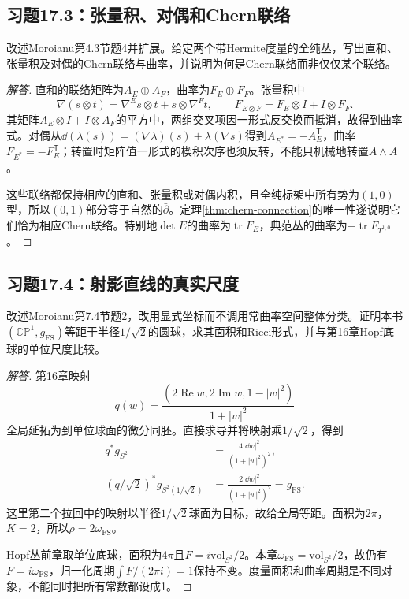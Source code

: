 \subsection*{习题17.3：张量积、对偶和Chern联络}
改述Moroianu第4.3节题4并扩展。给定两个带Hermite度量的全纯丛，写出直和、张量积及对偶的Chern联络与曲率，并说明为何是Chern联络而非仅仅某个联络。
\begin{proof}[解答]
直和的联络矩阵为$A_E\oplus A_F$，曲率为$F_E\oplus F_F$。张量积中
\[
 \nabla(s\otimes t)=\nabla^Es\otimes t+s\otimes\nabla^Ft,
 \qquad F_{E\otimes F}=F_E\otimes I+I\otimes F_F.
\]
其矩阵$A_E\otimes I+I\otimes A_F$的平方中，两组交叉项因一形式反交换而抵消，故得到曲率式。对偶从$\dd(\lambda(s))=(\nabla\lambda)(s)+\lambda(\nabla s)$得到$A_{E^*}=-A_E^{\mathsf T}$，曲率$F_{E^*}=-F_E^{\mathsf T}$；转置时矩阵值一形式的楔积次序也须反转，不能只机械地转置$A\wedge A$。

这些联络都保持相应的直和、张量积或对偶内积，且全纯标架中所有势为$(1,0)$型，所以$(0,1)$部分等于自然的$\bar\partial$。定理\ref{thm:chern-connection}的唯一性遂说明它们恰为相应Chern联络。特别地$\det E$的曲率为$\operatorname{tr}F_E$，典范丛的曲率为$-\operatorname{tr}F_{T^{1,0}}$。
\end{proof}

\subsection*{习题17.4：射影直线的真实尺度}
改述Moroianu第7.4节题2，改用显式坐标而不调用常曲率空间整体分类。证明本书$(\mathbb{CP}^1,g_{\mathrm{FS}})$等距于半径$1/\sqrt2$的圆球，求其面积和Ricci形式，并与第16章Hopf底球的单位尺度比较。
\begin{proof}[解答]
第16章映射
\[
 q(w)=\frac{(2\operatorname{Re}w,2\operatorname{Im}w,1-|w|^2)}{1+|w|^2}
\]
全局延拓为到单位球面的微分同胚。直接求导并将映射乘$1/\sqrt2$，得到
\begin{align*}
 q^*g_{S^2}&=\frac{4|\dd w|^2}{(1+|w|^2)^2},\\
 (q/\sqrt2)^*g_{S^2(1/\sqrt2)}&=\frac{2|\dd w|^2}{(1+|w|^2)^2}=g_{\mathrm{FS}}.
\end{align*}
这里第二个拉回中的映射以半径$1/\sqrt2$球面为目标，故给全局等距。面积为$2\pi$，$K=2$，所以$\rho=2\omega_{\mathrm{FS}}$。

Hopf丛前章取单位底球，面积为$4\pi$且$F=i\mathrm{vol}_{S^2}/2$。本章$\omega_{\mathrm{FS}}=\mathrm{vol}_{S^2}/2$，故仍有$F=i\omega_{\mathrm{FS}}$，归一化周期$\int F/(2\pi i)=1$保持不变。度量面积和曲率周期是不同对象，不能同时把所有常数都设成1。
\end{proof}

